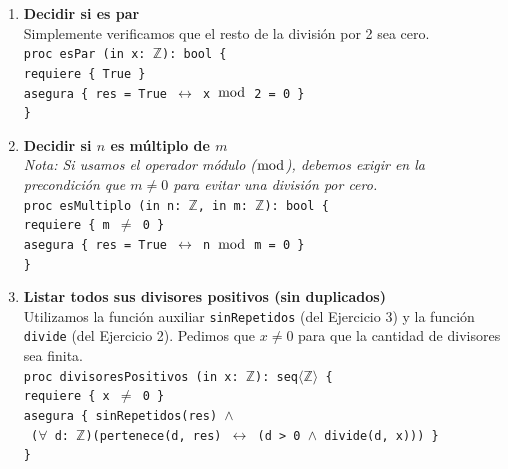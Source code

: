\begin{enumerate}[label=\textbf{\alph*)}]

    \item \textbf{Decidir si es par} \\
    Simplemente verificamos que el resto de la división por 2 sea cero. \\
    \texttt{proc esPar (in x: $\mathbb{Z}$): bool \{} \\
    \texttt{\hspace*{0.5cm}requiere \{ True \}} \\
    \texttt{\hspace*{0.5cm}asegura \{ res = True $\leftrightarrow$ x $\bmod$ 2 = 0 \}} \\
    \texttt{\}}

    \vspace{0.4cm}
    \item \textbf{Decidir si $n$ es múltiplo de $m$} \\
    \textit{Nota: Si usamos el operador módulo ($\bmod$), debemos exigir en la precondición que $m \neq 0$ para evitar una división por cero.} \\
    \texttt{proc esMultiplo (in n: $\mathbb{Z}$, in m: $\mathbb{Z}$): bool \{} \\
    \texttt{\hspace*{0.5cm}requiere \{ m $\neq$ 0 \}} \\
    \texttt{\hspace*{0.5cm}asegura \{ res = True $\leftrightarrow$ n $\bmod$ m = 0 \}} \\
    \texttt{\}}

    \vspace{0.4cm}
    \item \textbf{Listar todos sus divisores positivos (sin duplicados)} \\
    Utilizamos la función auxiliar \texttt{sinRepetidos} (del Ejercicio 3) y la función \texttt{divide} (del Ejercicio 2). Pedimos que $x \neq 0$ para que la cantidad de divisores sea finita. \\
    \texttt{proc divisoresPositivos (in x: $\mathbb{Z}$): seq$\langle\mathbb{Z}\rangle$ \{} \\
    \texttt{\hspace*{0.5cm}requiere \{ x $\neq$ 0 \}} \\
    \texttt{\hspace*{0.5cm}asegura \{ sinRepetidos(res) $\wedge$} \\
    \texttt{\hspace*{1.0cm} ($\forall$ d: $\mathbb{Z}$)(pertenece(d, res) $\leftrightarrow$ (d > 0 $\wedge$ divide(d, x))) \}} \\
    \texttt{\}}


\end{enumerate}
